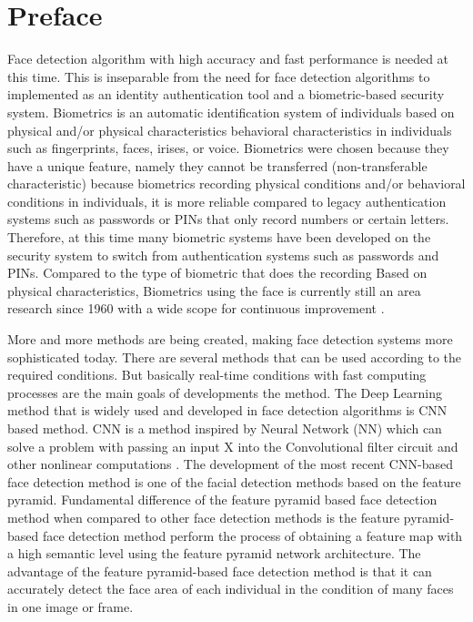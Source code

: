 \section{Preface}
\label{sec:pendahuluan}


Face detection algorithm with high accuracy and fast performance is needed
at this time. This is inseparable from the need for face detection algorithms to
implemented as an identity authentication tool and a biometric-based security system.
Biometrics is an automatic identification system of individuals based on physical and/or physical characteristics
behavioral characteristics in individuals such as fingerprints, faces, irises, or voice\citep{doi:10.1080/09505431.2018.1519534}.
Biometrics were chosen because they have a unique feature, namely they cannot be transferred (non-transferable characteristic) because biometrics
recording physical conditions and/or behavioral conditions in individuals, it is more
reliable compared to legacy authentication systems such as passwords or PINs that only record numbers
or certain letters\citep{1597098}. Therefore, at this time many biometric systems have been developed
on the security system to switch from authentication systems such as passwords and PINs. Compared to the type of biometric that does the recording
Based on physical characteristics, Biometrics using the face is currently still an area
research since 1960 with a wide scope for continuous improvement \citep{zufar}.

More and more methods are being created, making face detection systems more sophisticated today.
There are several methods that can be used according to the required conditions. But basically
real-time conditions with fast computing processes are the main goals of developments
the method. The Deep Learning method that is widely used and developed in face detection algorithms is
CNN based method. CNN is a method inspired by Neural Network (NN) which can solve
a problem with passing an input X into the Convolutional filter circuit and other nonlinear computations \citep{lecun1989handwritten}.
The development of the most recent CNN-based face detection method is one of the facial detection methods based on the feature pyramid. Fundamental difference
of the feature pyramid based face detection method when compared to other face detection methods is the feature pyramid-based face detection method
perform the process of obtaining a feature map with a high semantic level using the feature pyramid network \citep{lin2017feature} architecture. 
The advantage of the feature pyramid-based face detection method is that it can accurately detect the face area of each individual 
in the condition of many faces in one image or frame.

